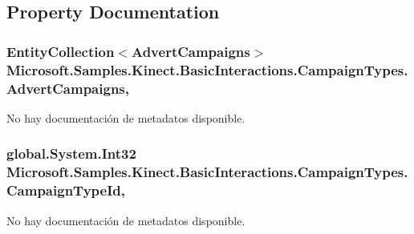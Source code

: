 \subsection{Property Documentation}
\hypertarget{class_microsoft_1_1_samples_1_1_kinect_1_1_basic_interactions_1_1_campaign_types_a1d9380eb1c0f7617cf3123bb665eaef4}{
\subsubsection[{Advert\-Campaigns}]{\setlength{\rightskip}{0pt plus 5cm}Entity\-Collection$<${\bf Advert\-Campaigns}$>$ Microsoft.\-Samples.\-Kinect.\-Basic\-Interactions.\-Campaign\-Types.\-Advert\-Campaigns\hspace{0.3cm}{\ttfamily [get]}, {\ttfamily [set]}}}\label{class_microsoft_1_1_samples_1_1_kinect_1_1_basic_interactions_1_1_campaign_types_a1d9380eb1c0f7617cf3123bb665eaef4}


No hay documentación de metadatos disponible. 

\hypertarget{class_microsoft_1_1_samples_1_1_kinect_1_1_basic_interactions_1_1_campaign_types_ab95001b8b8ce40e625e0b108e3db9648}{
\subsubsection[{Campaign\-Type\-Id}]{\setlength{\rightskip}{0pt plus 5cm}global.\-System.\-Int32 Microsoft.\-Samples.\-Kinect.\-Basic\-Interactions.\-Campaign\-Types.\-Campaign\-Type\-Id\hspace{0.3cm}{\ttfamily [get]}, {\ttfamily [set]}}}\label{class_microsoft_1_1_samples_1_1_kinect_1_1_basic_interactions_1_1_campaign_types_ab95001b8b8ce40e625e0b108e3db9648}


No hay documentación de metadatos disponible. 

